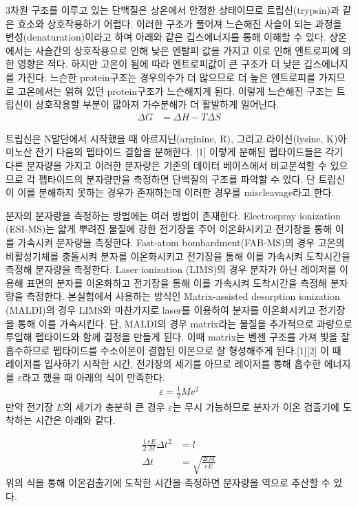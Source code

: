 \documentclass[%
 reprint,
 amsmath,amssymb,
 aps,
]{revtex4-2}
\begin{document}
3차원 구조를 이루고 있는 단백질은 상온에서 안정한 상태이므로 트립신(trypsin)과 같은 효소와 상호작용하기 어렵다. 이러한 구조가 풀어져 느슨해진 사슬이 되는 과정을 변성(denaturation)이라고 하며 아래와 같은 깁스에너지를 통해 이해할 수 있다. 상온에서는 사슬간의 상호작용으로 인해 낮은 엔탈피 값을 가지고 이로 인해 엔트로피에 의한 영향은 적다. 하지만 고온이 됨에 따라 엔트로피값이 큰 구조가 더 낮은 깁스에너지를 가진다. 느슨한 protein구조는 경우의수가 더 많으므로 더 높은 엔트로피를 가지므로 고온에서는 얽혀 있던 protein구조가 느슨해지게 된다. 이렇게 느슨해진 구조는 트립신이 상호작용할 부분이 많아져 가수분해가 더 활발하게 일어난다.
\begin{align}
	\Delta G &= \Delta H - T \Delta S
\end{align}

트립신은 N말단에서 시작했을 때 아르지닌(arginine, R), 그리고 라이신(lysine, K)아미노산 잔기 다음의 펩타이드 결합을 분해한다. [1] 이렇게 분해된 펩타이드들은 각기 다른 분자량을 가지고 이러한 분자량은 기존의 데이터 베이스에서 비교분석할 수 있으므로 각 펩타이드의 분자량만을 측정하면 단백질의 구조를 파악할 수 있다. 단 트립신이 이를 분해하지 못하는 경우가 존재하는데 이러한 경우를 miscleavage라고 한다.

분자의 분자량을 측정하는 방법에는 여러 방법이 존재한다. Electrospray ionization (ESI-MS)는 얇게 뿌려진 물질에 강한 전기장을 주어 이온화시키고 전기장을 통해 이를 가속시켜 분자량을 측정한다. Fast-atom bombardment(FAB-MS)의 경우 고온의 비활성기체를 충돌시켜 분자를 이온화시키고 전기장을 통해 이를 가속시켜 도착시간을 측정해 분자량을 측정한다. Laser ionization (LIMS)의 경우 분자가 아닌 레이저를 이용해 표면의 분자를 이온화하고 전기장을 통해 이를 가속시켜 도착시간을 측정해 분자량을 측정한다. 본실험에서 사용하는 방식인 Matrix-assisted desorption ionization (MALDI)의 경우 LIMS와 마찬가지로 laser를 이용하여 분자를 이온화시키고 전기장을 통해 이를 가속시킨다. 단, MALDI의 경우 matrix라는 물질을 추가적으로 과량으로 투입해 펩타이드와 함께 결정을 만들게 된다. 이때 matrix는 벤젠 구조를 가져 빛을 잘흡수하므로 펩타이드를 수소이온이 결합된 이온으로 잘 형성해주게 된다.[1][2] 이 때 레이저를 입사하기 시작한 시간, 전기장의 세기를 아므로 레이저를 통해 흡수한 에너지를 $\varepsilon$라고 했을 때 아래의 식이 만족한다.
\begin{align}
	\varepsilon = \frac{1}{2}Mv^{2}
\end{align}
만약 전기장 $E$의 세기가 충분히 큰 경우  $\varepsilon$는 무시 가능하므로 분자가 이온 검출기에 도착하는 시간은 아래와 같다.

\begin{align}
	\frac{1}{2}\frac{eE}{M}\Delta t^{2} &= l\\
	\Delta t &= \sqrt{\frac{2lM}{eE}}
\end{align}
위의 식을 통해 이온검출기에 도착한 시간을 측정하면 분자량을 역으로 추산할 수 있다.
\end{document}
